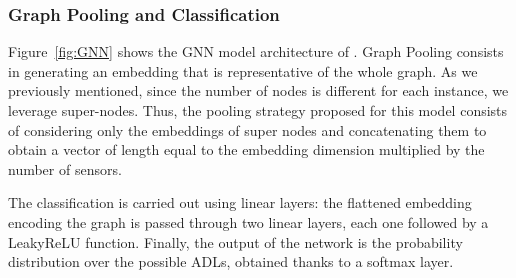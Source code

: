 


\subsubsection{Graph Pooling and Classification}

Figure~\ref{fig:GNN} shows the GNN model architecture of \acronym{}.
Graph Pooling consists in generating an embedding that is representative of the whole graph. As we previously mentioned, since the number of nodes is different for each instance, we leverage super-nodes. Thus, the pooling strategy proposed for this model consists of considering only the embeddings of super nodes and concatenating them to obtain a vector of length equal to the embedding dimension multiplied by the number of sensors.

The classification is carried out using linear layers: the flattened embedding encoding the graph is passed through two linear layers, each one followed by a LeakyReLU function. Finally, the output of the network is the probability distribution over the possible ADLs, obtained thanks to a softmax layer.

